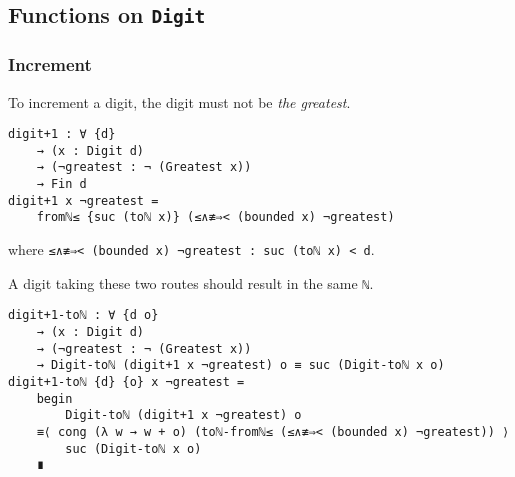 \documentclass[\main/thesis.tex]{subfiles}
\begin{document}
\subsection{Functions on \lstinline|Digit|}

\subsubsection{Increment}

To increment a digit, the digit must not be \textit{the greatest}.

\begin{lstlisting}
digit+1 : ∀ {d}
    → (x : Digit d)
    → (¬greatest : ¬ (Greatest x))
    → Fin d
digit+1 x ¬greatest =
    fromℕ≤ {suc (toℕ x)} (≤∧≢⇒< (bounded x) ¬greatest)
\end{lstlisting}
%
where {\lstinline|≤∧≢⇒< (bounded x) ¬greatest : suc (toℕ x) < d|}.

\begin{center}
\end{center}

A digit taking these two routes should result in the same {{\lstinline|ℕ|}}.

\begin{lstlisting}[basicstyle=\ttfamily\scriptsize]
digit+1-toℕ : ∀ {d o}
    → (x : Digit d)
    → (¬greatest : ¬ (Greatest x))
    → Digit-toℕ (digit+1 x ¬greatest) o ≡ suc (Digit-toℕ x o)
digit+1-toℕ {d} {o} x ¬greatest =
    begin
        Digit-toℕ (digit+1 x ¬greatest) o
    ≡⟨ cong (λ w → w + o) (toℕ-fromℕ≤ (≤∧≢⇒< (bounded x) ¬greatest)) ⟩
        suc (Digit-toℕ x o)
    ∎
\end{lstlisting}
\end{document}
